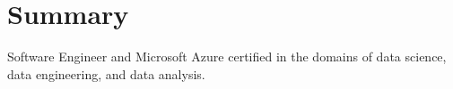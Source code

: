
\section{Summary}
\sectionStart
  \summaryText
  {Software Engineer and  Microsoft Azure certified in the domains of data science, data engineering, and data analysis.}
\sectionEnd